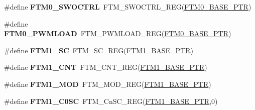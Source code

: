\begin{DoxyCompactItemize}
\item 
\hypertarget{group___f_t_m___register___accessor___macros_ga1d17162121263a5b97b1a575ea3c877c}{}\#define {\bfseries F\+T\+M0\+\_\+\+S\+W\+O\+C\+T\+R\+L}~F\+T\+M\+\_\+\+S\+W\+O\+C\+T\+R\+L\+\_\+\+R\+E\+G(\hyperlink{group___f_t_m___peripheral_gae712c29b7abcf338d8f8f6418683fa66}{F\+T\+M0\+\_\+\+B\+A\+S\+E\+\_\+\+P\+T\+R})\label{group___f_t_m___register___accessor___macros_ga1d17162121263a5b97b1a575ea3c877c}

\item 
\hypertarget{group___f_t_m___register___accessor___macros_gaaf7fca8f1a3586ef43e159d6090ca2d5}{}\#define {\bfseries F\+T\+M0\+\_\+\+P\+W\+M\+L\+O\+A\+D}~F\+T\+M\+\_\+\+P\+W\+M\+L\+O\+A\+D\+\_\+\+R\+E\+G(\hyperlink{group___f_t_m___peripheral_gae712c29b7abcf338d8f8f6418683fa66}{F\+T\+M0\+\_\+\+B\+A\+S\+E\+\_\+\+P\+T\+R})\label{group___f_t_m___register___accessor___macros_gaaf7fca8f1a3586ef43e159d6090ca2d5}

\item 
\hypertarget{group___f_t_m___register___accessor___macros_ga6099bde5affc8eacd854bd1c1e2b8c56}{}\#define {\bfseries F\+T\+M1\+\_\+\+S\+C}~F\+T\+M\+\_\+\+S\+C\+\_\+\+R\+E\+G(\hyperlink{group___f_t_m___peripheral_ga38115fba8eadfc94b2fc411f45906002}{F\+T\+M1\+\_\+\+B\+A\+S\+E\+\_\+\+P\+T\+R})\label{group___f_t_m___register___accessor___macros_ga6099bde5affc8eacd854bd1c1e2b8c56}

\item 
\hypertarget{group___f_t_m___register___accessor___macros_gaa4305daf4f761c0170ec10fa2e0db280}{}\#define {\bfseries F\+T\+M1\+\_\+\+C\+N\+T}~F\+T\+M\+\_\+\+C\+N\+T\+\_\+\+R\+E\+G(\hyperlink{group___f_t_m___peripheral_ga38115fba8eadfc94b2fc411f45906002}{F\+T\+M1\+\_\+\+B\+A\+S\+E\+\_\+\+P\+T\+R})\label{group___f_t_m___register___accessor___macros_gaa4305daf4f761c0170ec10fa2e0db280}

\item 
\hypertarget{group___f_t_m___register___accessor___macros_ga01599f0d6cd00a138e4e854692bb8126}{}\#define {\bfseries F\+T\+M1\+\_\+\+M\+O\+D}~F\+T\+M\+\_\+\+M\+O\+D\+\_\+\+R\+E\+G(\hyperlink{group___f_t_m___peripheral_ga38115fba8eadfc94b2fc411f45906002}{F\+T\+M1\+\_\+\+B\+A\+S\+E\+\_\+\+P\+T\+R})\label{group___f_t_m___register___accessor___macros_ga01599f0d6cd00a138e4e854692bb8126}

\item 
\hypertarget{group___f_t_m___register___accessor___macros_gaac1710c65463d98f9003b4a10991b26b}{}\#define {\bfseries F\+T\+M1\+\_\+\+C0\+S\+C}~F\+T\+M\+\_\+\+Cn\+S\+C\+\_\+\+R\+E\+G(\hyperlink{group___f_t_m___peripheral_ga38115fba8eadfc94b2fc411f45906002}{F\+T\+M1\+\_\+\+B\+A\+S\+E\+\_\+\+P\+T\+R},0)\label{group___f_t_m___register___accessor___macros_gaac1710c65463d98f9003b4a10991b26b}


\end{DoxyCompactItemize}

